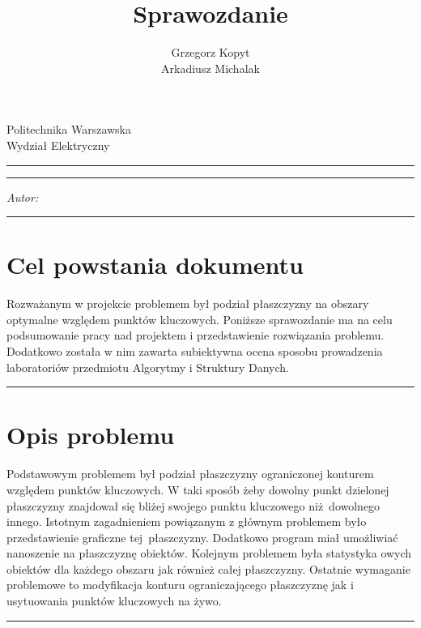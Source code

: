 \documentclass[a4paper,11pt]{article}
\author{Grzegorz Kopyt\\Arkadiusz Michalak}
\title{Sprawozdanie}
\makeatletter
\newcommand{\linia}{\rule{\linewidth}{0.4mm}}
\renewcommand{\maketitle}{\begin{titlepage}
    \vspace*{2cm}
    \begin{center}\LARGE
    Politechnika Warszawska\\
    Wydział Elektryczny\\
    \end{center}
    \vspace{5cm}
    \noindent\linia
    \begin{center}
      \LARGE \textsc{\@title}
         \end{center}
     \linia
    \vspace{0.5cm}
    \begin{flushright}
    \begin{minipage}{5cm}
    \textit{Autor:}\\
    \normalsize \textsc{\@author} \par
    \end{minipage}
    \vspace{5cm}
     \end{flushright}
    \vspace*{\stretch{6}}
    \begin{center}
    \@date
    \end{center}
  \end{titlepage}
}
\makeatother
\begin{document}
\maketitle

\tableofcontents
\vspace{1cm}
\noindent\linia
\section{Cel powstania dokumentu}
Rozważanym w projekcie problemem był podział płaszczyzny na obszary optymalne względem punktów kluczowych. Poniższe sprawozdanie ma na celu podsumowanie pracy nad projektem i przedstawienie rozwiązania problemu. Dodatkowo została w nim zawarta subiektywna ocena sposobu prowadzenia laboratoriów przedmiotu Algorytmy i Struktury Danych.

\noindent\linia
\section{Opis problemu}
Podstawowym problemem był podział płaszczyzny ograniczonej konturem względem punktów kluczowych. W taki sposób żeby dowolny punkt dzielonej płaszczyzny znajdował się bliżej swojego punktu kluczowego niż~dowolnego innego. Istotnym zagadnieniem powiązanym z głównym problemem było przedstawienie graficzne tej~płaszczyzny. Dodatkowo program miał umożliwiać nanoszenie na płaszczyznę obiektów. Kolejnym problemem była statystyka owych obiektów dla każdego obszaru jak również całej płaszczyzny. Ostatnie wymaganie problemowe to modyfikacja konturu ograniczającego płaszczyznę jak i usytuowania punktów kluczowych na żywo. 

\noindent\linia
\end{document}
